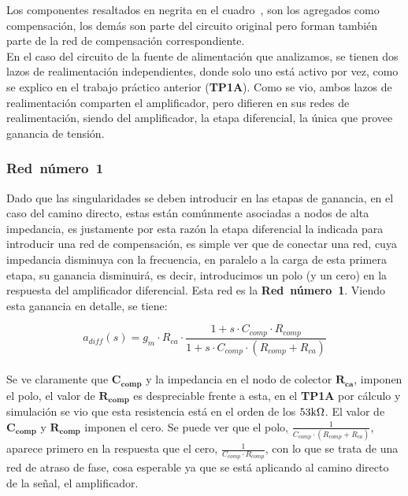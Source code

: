 



Los componentes resaltados en negrita en el cuadro~, son los agregados como compensación, los demás son parte del circuito original pero forman también parte de la red de compensación correspondiente.\\


En el caso del circuito de la fuente de alimentación que analizamos, se tienen dos lazos de realimentación independientes, donde solo uno está activo por vez, como se explico en el trabajo práctico anterior (\textbf{TP1A}). Como se vio, ambos lazos  de realimentación comparten el amplificador, pero difieren en sus redes de realimentación, siendo del amplificador, la etapa diferencial, la única que provee ganancia de tensión.\\

\vfill

\clearpage

\subsubsection{\textbf{Red~número~1}}

Dado que las singularidades se deben introducir en las etapas de ganancia, en el caso del camino directo, estas están comúnmente asociadas a nodos de alta impedancia, es justamente por esta razón la etapa diferencial la indicada para introducir una red de compensación, es simple ver que de conectar una red, cuya impedancia disminuya con la frecuencia, en paralelo a la carga de esta primera etapa, su ganancia disminuirá, es decir, introducimos un polo (y un cero) en la respuesta del amplificador diferencial. Esta red es la \textbf{Red~número~1}. Viendo esta ganancia en detalle, se tiene:

\begin{equation}
a_{diff}\left(s\right) = g_m \cdot R_{ca} \cdot \frac{1+ s \cdot C_{comp} \cdot R_{comp}}{ 1 + s \cdot C_{comp} \cdot \left( R_{comp} + R_{ca} \right) }
\end{equation}\\

Se ve claramente que  $\bm{C_{comp}}$ y la impedancia en el nodo de colector $\bm{R_{ca}}$, imponen el polo, el valor de $\bm{R_{comp}}$ es despreciable frente a esta, en el \textbf{TP1A} por cálculo y simulación se vio que esta resistencia está en el orden de los $53 \si[per-mode=symbol]{\kilo\ohm}$. El valor de $\bm{C_{comp}}$ y $\bm{R_{comp}}$ imponen el cero. Se puede ver que el polo, $\frac{1}{ C_{comp} \cdot \left( R_{comp}+R_{ca} \right) }$, aparece primero en la respuesta que el cero, $ \frac{1}{C_{comp} \cdot R_{comp}}$, con lo que se trata de una red de atraso de fase, cosa esperable ya que se está aplicando al camino directo de la señal, el amplificador.\\

